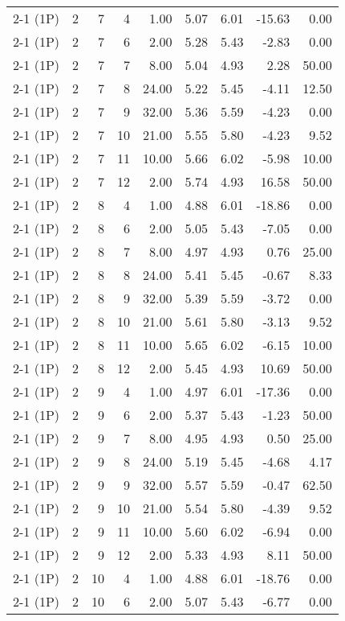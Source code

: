 \begin{tabular}{lrrrrrrrr}
2-1 (1P) & 2 & 7 & 4 & 1.00 & 5.07 & 6.01 & -15.63 & 0.00 \\
2-1 (1P) & 2 & 7 & 6 & 2.00 & 5.28 & 5.43 & -2.83 & 0.00 \\
2-1 (1P) & 2 & 7 & 7 & 8.00 & 5.04 & 4.93 & 2.28 & 50.00 \\
2-1 (1P) & 2 & 7 & 8 & 24.00 & 5.22 & 5.45 & -4.11 & 12.50 \\
2-1 (1P) & 2 & 7 & 9 & 32.00 & 5.36 & 5.59 & -4.23 & 0.00 \\
2-1 (1P) & 2 & 7 & 10 & 21.00 & 5.55 & 5.80 & -4.23 & 9.52 \\
2-1 (1P) & 2 & 7 & 11 & 10.00 & 5.66 & 6.02 & -5.98 & 10.00 \\
2-1 (1P) & 2 & 7 & 12 & 2.00 & 5.74 & 4.93 & 16.58 & 50.00 \\
2-1 (1P) & 2 & 8 & 4 & 1.00 & 4.88 & 6.01 & -18.86 & 0.00 \\
2-1 (1P) & 2 & 8 & 6 & 2.00 & 5.05 & 5.43 & -7.05 & 0.00 \\
2-1 (1P) & 2 & 8 & 7 & 8.00 & 4.97 & 4.93 & 0.76 & 25.00 \\
2-1 (1P) & 2 & 8 & 8 & 24.00 & 5.41 & 5.45 & -0.67 & 8.33 \\
2-1 (1P) & 2 & 8 & 9 & 32.00 & 5.39 & 5.59 & -3.72 & 0.00 \\
2-1 (1P) & 2 & 8 & 10 & 21.00 & 5.61 & 5.80 & -3.13 & 9.52 \\
2-1 (1P) & 2 & 8 & 11 & 10.00 & 5.65 & 6.02 & -6.15 & 10.00 \\
2-1 (1P) & 2 & 8 & 12 & 2.00 & 5.45 & 4.93 & 10.69 & 50.00 \\
2-1 (1P) & 2 & 9 & 4 & 1.00 & 4.97 & 6.01 & -17.36 & 0.00 \\
2-1 (1P) & 2 & 9 & 6 & 2.00 & 5.37 & 5.43 & -1.23 & 50.00 \\
2-1 (1P) & 2 & 9 & 7 & 8.00 & 4.95 & 4.93 & 0.50 & 25.00 \\
2-1 (1P) & 2 & 9 & 8 & 24.00 & 5.19 & 5.45 & -4.68 & 4.17 \\
2-1 (1P) & 2 & 9 & 9 & 32.00 & 5.57 & 5.59 & -0.47 & 62.50 \\
2-1 (1P) & 2 & 9 & 10 & 21.00 & 5.54 & 5.80 & -4.39 & 9.52 \\
2-1 (1P) & 2 & 9 & 11 & 10.00 & 5.60 & 6.02 & -6.94 & 0.00 \\
2-1 (1P) & 2 & 9 & 12 & 2.00 & 5.33 & 4.93 & 8.11 & 50.00 \\
2-1 (1P) & 2 & 10 & 4 & 1.00 & 4.88 & 6.01 & -18.76 & 0.00 \\
2-1 (1P) & 2 & 10 & 6 & 2.00 & 5.07 & 5.43 & -6.77 & 0.00 \\

\end{tabular}
